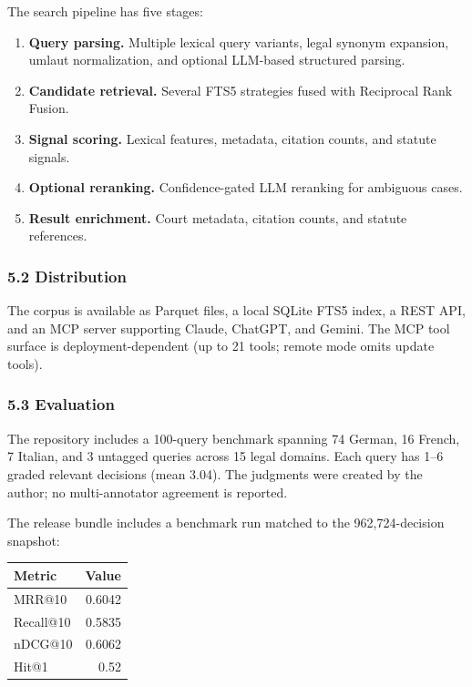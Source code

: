 \documentclass[
  11pt,
]{article}
\newcounter{none} %
\providecommand{\tightlist}{%
  \setlength{\itemsep}{0pt}\setlength{\parskip}{0pt}}
\begin{document}
The search pipeline has five stages:

\begin{enumerate}
\def\labelenumi{\arabic{enumi}.}
\tightlist
\item
  \textbf{Query parsing.} Multiple lexical query variants, legal synonym
  expansion, umlaut normalization, and optional LLM-based structured
  parsing.
\item
  \textbf{Candidate retrieval.} Several FTS5 strategies fused with
  Reciprocal Rank Fusion.
\item
  \textbf{Signal scoring.} Lexical features, metadata, citation counts,
  and statute signals.
\item
  \textbf{Optional reranking.} Confidence-gated LLM reranking for
  ambiguous cases.
\item
  \textbf{Result enrichment.} Court metadata, citation counts, and
  statute references.
\end{enumerate}

\subsubsection{5.2 Distribution}\label{distribution}

The corpus is available as Parquet files, a local SQLite FTS5 index, a
REST API, and an MCP server supporting Claude, ChatGPT, and Gemini. The
MCP tool surface is deployment-dependent (up to 21 tools; remote mode
omits update tools).

\subsubsection{5.3 Evaluation}\label{evaluation}

The repository includes a 100-query benchmark spanning 74 German, 16
French, 7 Italian, and 3 untagged queries across 15 legal domains. Each
query has 1--6 graded relevant decisions (mean 3.04). The judgments were
created by the author; no multi-annotator agreement is reported.

The release bundle includes a benchmark run matched to the
962,724-decision snapshot:

{\def\LTcaptype{none} %
\begin{longtable}[]{@{}lr@{}}
\toprule\noalign{}
Metric & Value \\
\midrule\noalign{}
\endhead
\bottomrule\noalign{}
\endlastfoot
MRR@10 & 0.6042 \\
Recall@10 & 0.5835 \\
nDCG@10 & 0.6062 \\
Hit@1 & 0.52 \\
\end{longtable}
}
\end{document}

